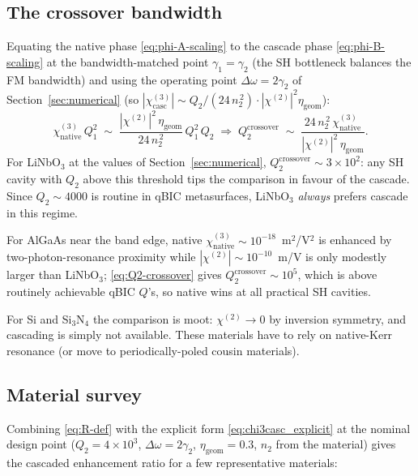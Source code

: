 \documentclass[11pt,a4paper]{article}
\newcommand{\chitwo}{\chi^{(2)}}
\newcommand{\chithree}{\chi^{(3)}}
\newcommand{\Dom}{\Delta\omega}
\begin{document}
\subsection*{The crossover bandwidth}

Equating the native phase \eqref{eq:phi-A-scaling} to the cascade
phase \eqref{eq:phi-B-scaling} at the bandwidth-matched point
$\gamma_1=\gamma_2$ (the SH bottleneck balances the FM bandwidth)
and using the operating point $\Dom=2\gamma_2$ of
Section~\ref{sec:numerical} (so $|\chithree_\text{casc}|\sim
Q_2/(24\,n_2^{\,2})\cdot|\chitwo|^{2}\eta_\text{geom}$):
\begin{equation}
  \chithree_\text{native}\,Q_1^{2}\;\sim\;
  \frac{|\chitwo|^{2}\,\eta_\text{geom}}{24\,n_2^{\,2}}\,Q_1^{2}\,Q_2
  \;\Longrightarrow\;
  Q_2^\text{crossover}\;\sim\;
       \frac{24\,n_2^{\,2}\,\chithree_\text{native}}{|\chitwo|^{2}\,\eta_\text{geom}}.
  \label{eq:Q2-crossover}
\end{equation}
For LiNbO$_3$ at the values of Section~\ref{sec:numerical},
$Q_2^\text{crossover}\sim 3\!\times\!10^{2}$: any SH cavity with $Q_2$
above this threshold tips the comparison in favour of the cascade.
Since $Q_2 \sim 4000$ is routine in qBIC metasurfaces, LiNbO$_3$
\emph{always} prefers cascade in this regime.

For AlGaAs near the band edge, native $\chithree_\text{native}\sim
10^{-18}$~m$^{2}$/V$^{2}$ is enhanced by two-photon-resonance proximity
while $|\chitwo|\sim 10^{-10}$~m/V is only modestly larger than
LiNbO$_3$; \eqref{eq:Q2-crossover} gives $Q_2^\text{crossover}\sim
10^{5}$, which is above routinely achievable qBIC $Q$'s, so native
wins at all practical SH cavities.

For Si and Si$_3$N$_4$ the comparison is moot: $\chitwo\to 0$ by
inversion symmetry, and cascading is simply not available.  These
materials have to rely on native-Kerr resonance (or move to
periodically-poled cousin materials).

\subsection*{Material survey}

Combining \eqref{eq:R-def} with the explicit form
\eqref{eq:chi3casc_explicit} at the nominal design point ($Q_2=
4{\times}10^{3}$, $\Dom=2\gamma_2$, $\eta_\text{geom}=0.3$, $n_2$ from
the material) gives the cascaded enhancement ratio for a few
representative materials:
\end{document}
